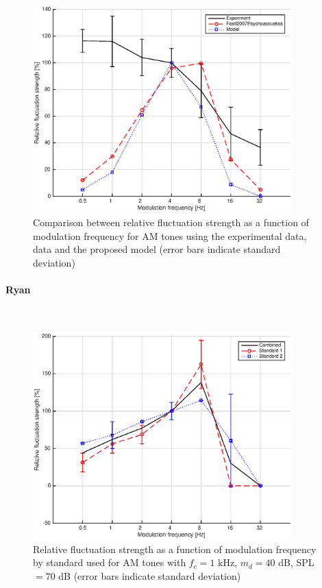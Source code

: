 \documentclass[a4paper]{article}
\begin{document}
\begin{figure}[H]
    \centering
    \includegraphics[height=8cm]{img/AM_tones-fm-results-Armin-comparison}
    \caption{Comparison between relative fluctuation strength as a function of
        modulation frequency for AM tones using the experimental data,
        \citeauthor{Fastl2007Psychoacoustics} data and the proposed model
        (error bars indicate standard deviation)}
\end{figure}

\paragraph{Ryan} ~\\

\begin{figure}[H]
    \centering
    \includegraphics[height=8cm]{img/AM_tones-fm-results-Ryan-standards}
    \caption{Relative fluctuation strength as a function of modulation
        frequency by standard used for AM tones with $f_c = 1$ kHz, $m_d = 40$
        dB, SPL $= 70$ dB (error bars indicate standard deviation)}
\end{figure}
\end{document}
